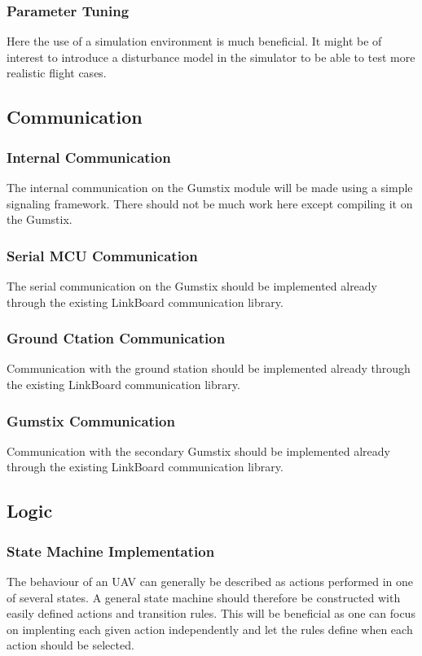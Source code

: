         \subsubsection{Parameter Tuning}
            Here the use of a simulation environment is much beneficial.
            It might be of interest to introduce a disturbance model in the
            simulator to be able to test more realistic flight cases.

    \subsection{Communication}
        \subsubsection{Internal Communication}
            The internal communication on the Gumstix module will be
            made using a simple signaling framework.
            There should not be much work here except compiling it on the
            Gumstix.

        \subsubsection{Serial MCU Communication}
            The serial communication on the Gumstix should be implemented
            already through the existing LinkBoard communication library.

        \subsubsection{Ground Ctation Communication}
            Communication with the ground station should be implemented
            already through the existing LinkBoard communication library.

        \subsubsection{Gumstix Communication}
            Communication with the secondary Gumstix should be implemented
            already through the existing LinkBoard communication library.

    \subsection{Logic}
        \subsubsection{State Machine Implementation}
            The behaviour of an UAV can generally be described as actions
            performed in one of several states. A general state machine
            should therefore be constructed with easily defined actions
            and transition rules. This will be beneficial as one can
            focus on implenting each given action independently and
            let the rules define when each action should be selected.

